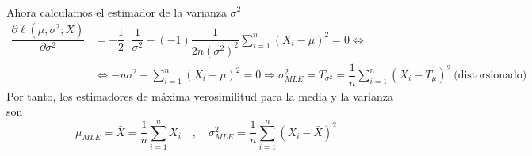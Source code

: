 \begin{ejemplo}
\begin{align*}
    \end{align*}
    Ahora calculamos el estimador de la varianza $\sigma^2$
    \begin{align*}
        \dfrac{\partial \ell(\mu, \sigma^2; X)}{\partial \sigma^2} &= -\dfrac{1}{2} \cdot \dfrac{1}{\sigma^2} - (-1) \dfrac{1}{2 n (\sigma^2)^2} \sum\limits_{i=1}^{n} (X_i - \mu)^2 = 0 \Longleftrightarrow \\
        &\Longleftrightarrow -n \sigma^2 + \sum\limits_{i=1}^{n} (X_i - \mu)^2 = 0 \Longrightarrow \sigma^2_{MLE}=T_{\sigma^2} = \dfrac{1}{n} \sum\limits_{i=1}^{n} (X_i - T_{\mu})^2 \ \text{(distorsionado)}
    \end{align*}
    Por tanto, los estimadores de máxima verosimilitud para la media y la varianza son
    \begin{equation*}
        \mu_{MLE} = \bar{X} = \dfrac{1}{n} \sum\limits_{i=1}^{n} X_i \quad , \quad \sigma^2_{MLE} = \dfrac{1}{n} \sum\limits_{i=1}^{n} (X_i - \bar{X})^2
    \end{equation*}
\end{ejemplo}

